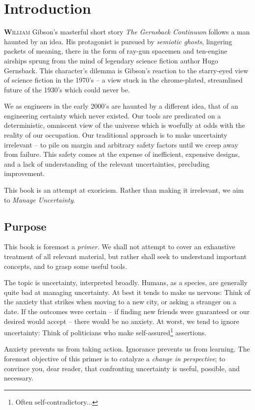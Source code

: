 \documentclass[../primer.tex]{subfiles}
\begin{document}
\chapter{Introduction}
\lettrine[findent=2pt]{\textbf{W}}{illiam} Gibson's masterful short story
\emph{The Gernsback Continuum}\cite{gibson1986chrome} follows a man haunted by
an idea. His protagonist is pursued by \emph{semiotic ghosts}, lingering packets
of meaning, there in the form of ray-gun spacemen and ten-engine airships sprung
from the mind of legendary science fiction author Hugo Gernsback. This
character's dilemma is Gibson's reaction to the starry-eyed view of science
fiction in the 1970's -- a view stuck in the chrome-plated, streamlined future
of the 1930's which could never be.

We as engineers in the early 2000's are haunted by a different idea, that of an
engineering certainty which never existed. Our tools are predicated on a
deterministic, omniscent view of the universe which is woefully at odds with the
reality of our occupation. Our traditional approach is to make uncertainty
irrelevant -- to pile on margin and arbitrary safety factors until we creep away
from failure. This safety comes at the expense of inefficient, expensive
designs, and a lack of understanding of the relevant uncertainties, precluding
improvement.

This book is an attempt at exoricism. Rather than making it irrelevant, we aim
to \emph{Manage Uncertainty}.

\section{Purpose}
This book is foremost a \emph{primer}. We shall not attempt to cover an
exhaustive treatment of all relevant material, but rather shall seek to
understand important concepts, and to grasp some useful tools.

The topic is uncertainty, interpreted broadly. Humans, as a species, are
generally quite bad at managing uncertainty. At best it tends to make us
nervous: Think of the anxiety that strikes when moving to a new city, or asking
a stranger on a date. If the outcomes were certain -- if finding new friends
were guaranteed or our desired would accept -- there would be no anxiety. At
worst, we tend to ignore uncertainty: Think of politicians who make
self-assured\footnote{Often self-contradictory...} assertions.

Anxiety prevents us from taking action. Ignorance prevents us from learning. The
foremost objective of this primer is to catalyze a \emph{change in perspective};
to convince you, dear reader, that confronting uncertainty is useful, possible,
and necessary.
\end{document}
